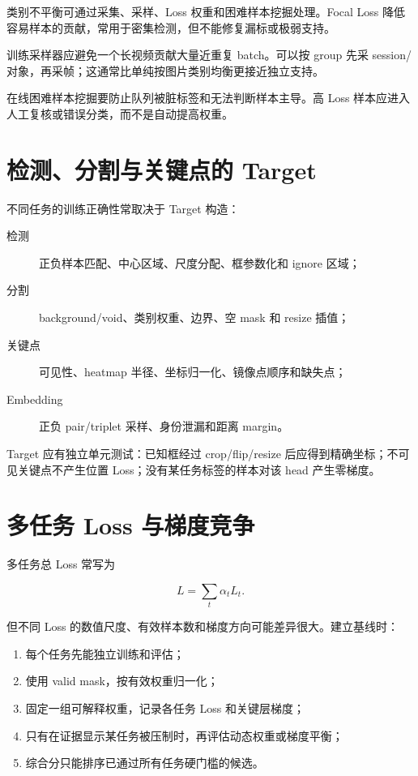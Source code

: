 类别不平衡可通过采集、采样、Loss 权重和困难样本挖掘处理。Focal Loss 降低容易样本的贡献，常用于密集检测，但不能修复漏标或极弱支持。

训练采样器应避免一个长视频贡献大量近重复 batch。可以按 group 先采 session/对象，再采帧；这通常比单纯按图片类别均衡更接近独立支持。

在线困难样本挖掘要防止队列被脏标签和无法判断样本主导。高 Loss 样本应进入人工复核或错误分类，而不是自动提高权重。

\section{检测、分割与关键点的 Target}

不同任务的训练正确性常取决于 Target 构造：

\begin{description}
  \item[检测] 正负样本匹配、中心区域、尺度分配、框参数化和 ignore 区域；
  \item[分割] background/void、类别权重、边界、空 mask 和 resize 插值；
  \item[关键点] 可见性、heatmap 半径、坐标归一化、镜像点顺序和缺失点；
  \item[Embedding] 正负 pair/triplet 采样、身份泄漏和距离 margin。
\end{description}

Target 应有独立单元测试：已知框经过 crop/flip/resize 后应得到精确坐标；不可见关键点不产生位置 Loss；没有某任务标签的样本对该 head 产生零梯度。

\section{多任务 Loss 与梯度竞争}

多任务总 Loss 常写为

\begin{equation}
  L=\sum_t \alpha_t L_t.
\end{equation}

但不同 Loss 的数值尺度、有效样本数和梯度方向可能差异很大。建立基线时：

\begin{enumerate}
  \item 每个任务先能独立训练和评估；
  \item 使用 valid mask，按有效权重归一化；
  \item 固定一组可解释权重，记录各任务 Loss 和关键层梯度；
  \item 只有在证据显示某任务被压制时，再评估动态权重或梯度平衡；
  \item 综合分只能排序已通过所有任务硬门槛的候选。
\end{enumerate}

